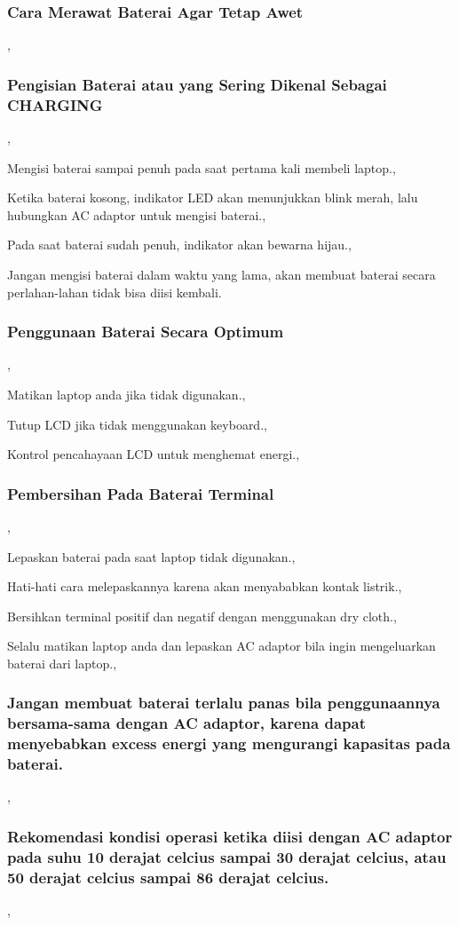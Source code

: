 \subsubsection{Cara Merawat Baterai Agar Tetap Awet},
	\subsubsection{Pengisian Baterai atau yang Sering Dikenal Sebagai CHARGING},
		\item{Mengisi baterai sampai penuh pada saat pertama kali membeli laptop.},
		\item{Ketika baterai kosong, indikator LED akan menunjukkan blink merah, lalu hubungkan AC adaptor untuk mengisi
		baterai.},
		\item{Pada saat baterai sudah penuh, indikator akan bewarna hijau.},
		\item{Jangan mengisi baterai dalam waktu yang lama, akan membuat baterai secara perlahan-lahan tidak bisa diisi kembali.}
	\subsubsection{Penggunaan Baterai Secara Optimum},
		\item{Matikan laptop anda jika tidak digunakan.},
		\item{Tutup LCD jika tidak menggunakan keyboard.},
		\item{Kontrol pencahayaan LCD untuk menghemat energi.},
	\subsubsection{Pembersihan Pada Baterai Terminal},
		\item{Lepaskan baterai pada saat laptop tidak digunakan.},
		\item{Hati-hati cara melepaskannya karena akan menyababkan kontak listrik.},
		\item{Bersihkan terminal positif dan negatif dengan menggunakan dry cloth.},
		\item{Selalu matikan laptop anda dan lepaskan AC adaptor bila ingin mengeluarkan baterai dari laptop.},
	\subsubsection{Jangan membuat baterai terlalu panas bila penggunaannya bersama-sama dengan AC adaptor, karena dapat 
	menyebabkan excess energi yang mengurangi kapasitas pada baterai.},
	\subsubsection{Rekomendasi kondisi operasi ketika diisi dengan AC adaptor pada suhu 10 derajat celcius sampai
	30 derajat celcius, atau 50 derajat celcius sampai 86 derajat celcius.},
